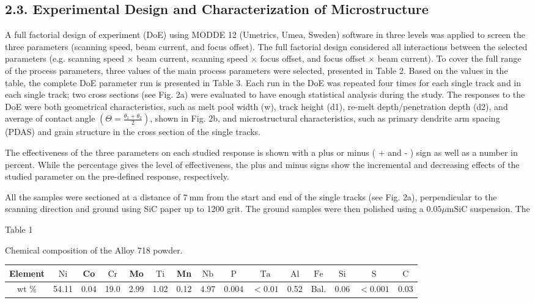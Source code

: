 \documentclass[10pt]{article}
\begin{document}
\subsection*{2.3. Experimental Design and Characterization of Microstructure}
A full factorial design of experiment (DoE) using MODDE 12 (Umetrics, Umea, Sweden) software in three levels was applied to screen the three parameters (scanning speed, beam current, and focus offset). The full factorial design considered all interactions between the selected parameters (e.g. scanning speed $\times$ beam current, scanning speed $\times$ focus offset, and focus offset $\times$ beam current). To cover the full range of the process parameters, three values of the main process parameters were selected, presented in Table 2. Based on the values in the table, the complete DoE parameter run is presented in Table 3. Each run in the DoE was repeated four times for each single track and in each single track; two cross sections (see Fig. 2a) were evaluated to have enough statistical analysis during the study. The responses to the DoE were both geometrical characteristics, such as melt pool width (w), track height (d1), re-melt depth/penetration depth (d2), and average of contact angle $\left(\Theta=\frac{\theta_{1}+\theta_{2}}{2}\right)$, shown in Fig. 2b, and microstructural characteristics, such as primary dendrite arm spacing (PDAS) and grain structure in the cross section of the single tracks.

The effectiveness of the three parameters on each studied response is shown with a plus or minus ( + and - ) sign as well as a number in percent. While the percentage gives the level of effectiveness, the plus and minus signs show the incremental and decreasing effects of the studied parameter on the pre-defined response, respectively.

All the samples were sectioned at a distance of $7 \mathrm{~mm}$ from the start and end of the single tracks (see Fig. 2a), perpendicular to the scanning direction and ground using SiC paper up to 1200 grit. The ground samples were then polished using a $0.05 \mu \mathrm{m} \mathrm{SiC}$ suspension. The

Table 1

Chemical composition of the Alloy 718 powder.

\begin{center}
\begin{tabular}{|c|c|c|c|c|c|c|c|c|c|c|c|c|c|c|}
\hline
Element & $\mathrm{Ni}$ & Co & $\mathrm{Cr}$ & Mo & $\mathrm{Ti}$ & Mn & $\mathrm{Nb}$ & $\mathrm{P}$ & $\mathrm{Ta}$ & $\mathrm{Al}$ & $\mathrm{Fe}$ & $\mathrm{Si}$ & $\mathrm{S}$ & $\mathrm{C}$ \\
\hline
wt $\%$ & 54.11 & 0.04 & 19.0 & 2.99 & 1.02 & 0.12 & 4.97 & 0.004 & $<0.01$ & 0.52 & Bal. & 0.06 & $<0.001$ & 0.03 \\
\hline
\end{tabular}
\end{center}
\end{document}
